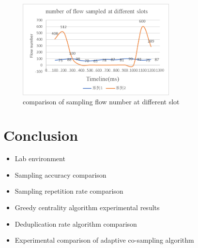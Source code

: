 \documentclass[conference]{IEEEtran}
\begin{document}
\begin{figure}[!hhhhhhhhhht]
\centering
\includegraphics[width=8cm]{images/num_slot.png}
\caption{comparison of sampling flow number at different slot}
\label{aaa.png}
\end{figure}



\section{Conclusion}
\begin{itemize}
\item Lab environment
\item Sampling accuracy comparison
\item Sampling repetition rate comparison
\item Greedy centrality algorithm experimental results
 
\item Deduplication rate algorithm comparison

\item Experimental comparison of adaptive co-sampling algorithm
\end{itemize}






 





\end{document}
